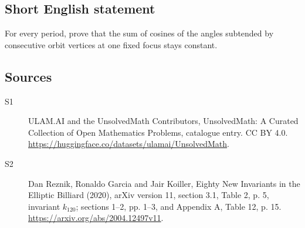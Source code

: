 \documentclass[11pt]{article}
\begin{document}
\subsection{Short English statement}
For every period, prove that the sum of cosines of the angles subtended by consecutive orbit vertices at one fixed focus stays constant.
\subsection{Sources}
\begin{description}
\item[\hypertarget{source:statement:1}{S1}] ULAM.AI and the UnsolvedMath Contributors, UnsolvedMath: A Curated Collection of Open Mathematics Problems, catalogue entry. CC BY 4.0. \url{https://huggingface.co/datasets/ulamai/UnsolvedMath}.
\item[\hypertarget{source:statement:2}{S2}] Dan Reznik, Ronaldo Garcia and Jair Koiller, Eighty New Invariants in the Elliptic Billiard (2020), arXiv version 11, section 3.1, Table 2, p. 5, invariant $k_{120}$; sections 1--2, pp. 1--3, and Appendix A, Table 12, p. 15. \url{https://arxiv.org/abs/2004.12497v11}.
\end{description}
\label{end:statement}
\end{document}
